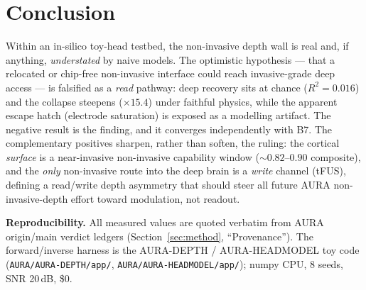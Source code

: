 \documentclass[11pt]{article}
\newcommand{\Rsq}{R^{2}}
\begin{document}
\section{Conclusion}
\label{sec:conclusion}

Within an in-silico toy-head testbed, the non-invasive depth wall is real and, if
anything, \emph{understated} by naive models. The optimistic hypothesis --- that a
relocated or chip-free non-invasive interface could reach invasive-grade deep access
--- is falsified as a \emph{read} pathway: deep recovery sits at chance
($\Rsq = 0.016$) and the collapse steepens ($\times 15.4$) under faithful physics,
while the apparent escape hatch (electrode saturation) is exposed as a modelling
artifact. The negative result is the finding, and it converges independently with
B7. The complementary positives sharpen, rather than soften, the ruling: the
cortical \emph{surface} is a near-invasive non-invasive capability window
($\sim 0.82$--$0.90$ composite), and the \emph{only} non-invasive route into the deep
brain is a \emph{write} channel (tFUS), defining a read/write depth asymmetry that
should steer all future AURA non-invasive-depth effort toward modulation, not
readout.

\bigskip
\noindent\textbf{Reproducibility.} All measured values are quoted verbatim from
AURA origin/main verdict ledgers (Section~\ref{sec:method}, ``Provenance''). The
forward/inverse harness is the AURA-DEPTH / AURA-HEADMODEL toy code
(\texttt{AURA/AURA-DEPTH/app/}, \texttt{AURA/AURA-HEADMODEL/app/}); numpy CPU,
8 seeds, SNR 20\,dB, \$0.



\end{document}
